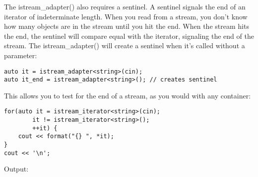 The istream\_adapter() also requires a sentinel. A sentinel signals the end of an iterator of indeterminate length. When you read from a stream, you don't know how many objects are in the stream until you hit the end. When the stream hits the end, the sentinel will compare equal with the iterator, signaling the end of the stream. The istream\_adapter() will create a sentinel when it's called without a parameter:

\begin{lstlisting}[style=styleCXX]
auto it = istream_adapter<string>(cin);
auto it_end = istream_adapter<string>(); // creates sentinel
\end{lstlisting}

This allows you to test for the end of a stream, as you would with any container:

\begin{lstlisting}[style=styleCXX]
for(auto it = istream_iterator<string>(cin);
		it != istream_iterator<string>();
		++it) {
	cout << format("{} ", *it);
}
cout << '\n';
\end{lstlisting}

Output:


